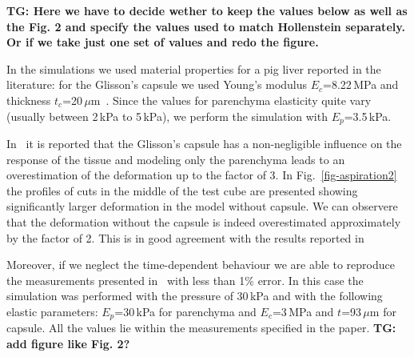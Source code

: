 \documentclass{acm_proc_article-sp}
\newcommand{\TG}[1]{{\color{blue}\textbf{TG: #1}}}
\begin{document}
\TG{Here we have to decide wether to keep the values below as well as the Fig.
2 and specify the values used to match Hollenstein separately. Or if we take
just one set of values and redo the figure.}

In the simulations we used material properties for a pig liver reported in the literature: for the 
Glisson's capsule we used Young's modulus $E_c$=8.22\,MPa and thickness $t_c$=20\,$\mu$m~\cite{Umale2011}.
Since the values for parenchyma elasticity quite vary (usually between 2\,kPa to 5\,kPa), we perform the simulation 
with $E_p$=3.5\,kPa.

In~\cite{Hollenstein2006} it is reported that the Glisson's
capsule has a non-negligible influence on the response of the tissue and modeling
only the parenchyma leads to an overestimation of the deformation up to the factor of 3. 
In Fig.~\ref{fig-aspiration2} the profiles of cuts in the middle of the
test cube are presented showing significantly larger deformation in the model without capsule.
We can observere that the deformation without the capsule is indeed overestimated approximately by the factor of 2. This is in good agreement with the results reported in~\cite{Hollenstein2006}

Moreover, if we neglect the time-dependent behaviour we are able to reproduce
the measurements presented in~\cite{Hollenstein2006,Nava2008} with less than 1\% error.
In this case the simulation was performed with the pressure of 30\,kPa and with
the following elastic parameters: $E_p$=30\,kPa for parenchyma and $E_c$=3\,MPa
and $t$=93\,$\mu$m for capsule. All the values lie within the measurements
specified in the paper. \TG{add figure like Fig. 2?}



\end{document}

